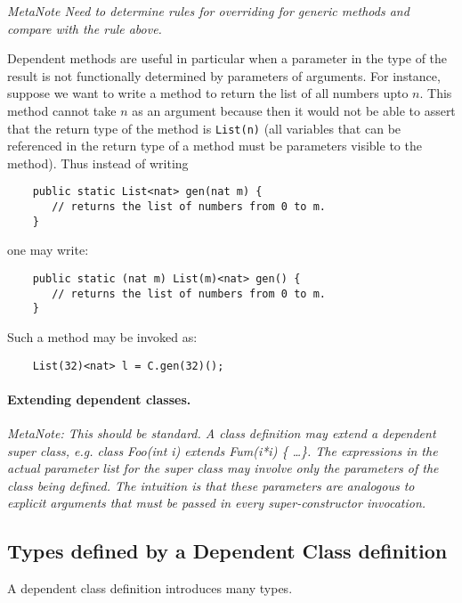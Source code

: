 \documentclass{article}
\begin{document}
{\em MetaNote Need to determine rules for overriding for generic
methods and compare with the rule above.}

Dependent methods are useful in particular when a parameter in the
type of the result is not functionally determined by parameters of
arguments. For instance, suppose we want to write a method to return
the list of all numbers upto $n$. This method cannot take $n$ as an
argument because then it would not be able to assert that the return
type of the method is {\tt List(n)} (all variables that can be
referenced in the return type of a method must be parameters visible
to the method). Thus instead of writing 
{\footnotesize
\begin{verbatim}
    public static List<nat> gen(nat m) {
       // returns the list of numbers from 0 to m.
    }
\end{verbatim}}
\noindent one may write:
{\footnotesize
\begin{verbatim}
    public static (nat m) List(m)<nat> gen() {
       // returns the list of numbers from 0 to m.
    }
\end{verbatim}}

Such a method may be invoked as:
{\footnotesize
\begin{verbatim}
    List(32)<nat> l = C.gen(32)();
\end{verbatim}}


\paragraph{Extending dependent classes.}

{\em MetaNote: This should be standard. A class definition may extend
a dependent super class, e.g. class Foo(int i) extends Fum(i*i) \{
\ldots \}. The expressions in the actual parameter list for the super
class may involve only the parameters of the class being defined. The
intuition is that these parameters are analogous to explicit arguments
that must be passed in every super-constructor invocation.}

\subsection{Types defined by a Dependent Class definition}
A dependent class definition introduces many types.
\end{document}
